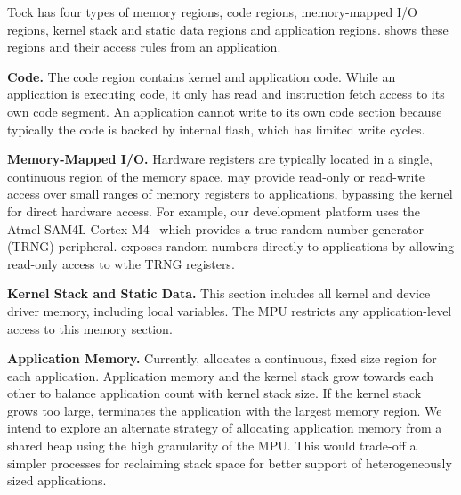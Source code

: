 Tock has four types of memory regions, code regions, memory-mapped I/O regions,
kernel stack and static data regions and application regions.
 shows these regions and their access rules from
an application.

{\bf Code.}
The code region contains kernel and application code. While an application is
executing code, it only has read and instruction fetch access to its own code
segment. An application cannot write to its own code section because typically
the code is backed by internal flash, which has limited write cycles.

{\bf Memory-Mapped I/O.}
Hardware registers are typically located in a single, continuous region of the
memory space. \name may provide read-only or read-write
access over small ranges of memory registers to applications, bypassing the
kernel for direct hardware access. For example, our development platform uses
the Atmel SAM4L Cortex-M4~\cite{sam4l} which provides a true random number
generator (TRNG) peripheral. \name exposes random numbers directly to
applications by allowing read-only access to wthe TRNG registers.

{\bf Kernel Stack and Static Data.}
This section includes all kernel and device driver memory, including local
variables. The MPU restricts any application-level access to this memory section.

{\bf Application Memory.}
Currently, \name allocates a continuous, fixed size region for each
application.
Application memory and the kernel stack grow towards each other to balance
application count with kernel stack size. If the kernel stack
grows too large, \name terminates the application with the
largest memory region. We intend to explore an alternate strategy of
allocating application memory from a shared heap using the
high granularity of the MPU.
This would trade-off
a simpler processes for reclaiming stack space
for better support of heterogeneously sized applications.


